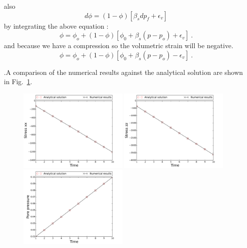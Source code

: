 \documentclass[]{scrreprt}
\begin{document}
\begin{itemize}
	also 
	\begin{equation}
	d\phi=(1-\phi)\left[\beta_s dp_f+\epsilon_v\right]
	\end{equation}
	by integrating the above equation :
	\begin{equation}
\phi = \phi_o+(1-\phi) \left[ \phi_0+\beta_s (p-p_o) + \epsilon_v \right] \ .
\end{equation}
	and because we have a compression so the volumetric strain will be negative.
	\begin{equation}
\phi = \phi_o+(1-\phi) \left[ \phi_0+\beta_s (p-p_o) - \epsilon_v \right] \ .
\end{equation}
	\end{itemize}
\fi
.A comparison of the numerical results against the analytical solution are shown in Fig.~\ref{fig:benchmark7_with_porosity}.
\begin{figure}
\label{fig:benchmark7_with_porosity}
  \centering
  \includegraphics[width=0.48\textwidth]{benchmark_7_HM/benchmark_7_HM_bench_HM_elastic_porosity_stress_xx}
  \includegraphics[width=0.48\textwidth]{benchmark_7_HM/benchmark_7_HM_bench_HM_elastic_porosity_stress_zz}\\
  \includegraphics[width=0.48\textwidth]{benchmark_7_HM/benchmark_7_HM_bench_HM_elastic_porosity_p0}

\end{figure}
\end{document}
